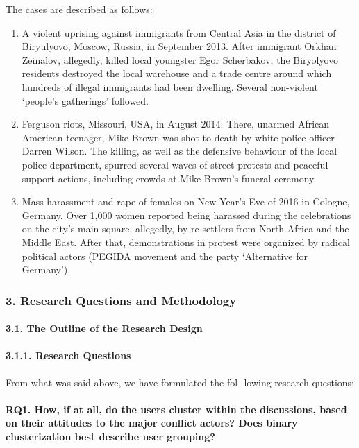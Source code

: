 The cases are described as follows:
\begin{enumerate}
	\item A violent uprising against immigrants from Central Asia in the district of Biryulyovo, Moscow, Russia, in September 2013. After immigrant Orkhan Zeinalov, allegedly, killed local youngster Egor Scherbakov, the Biryolyovo residents destroyed the local warehouse and a trade centre around which hundreds of illegal immigrants had been dwelling. Several non-violent ‘people’s gatherings’ followed.
	
	\item Ferguson riots, Missouri, USA, in August 2014. There, unarmed African American teenager, Mike Brown was shot to death by white police officer Darren Wilson. The killing, as well as the defensive behaviour of the local police department, spurred several waves of street protests and peaceful support actions, including crowds at Mike Brown’s funeral ceremony.
	
	\item Mass harassment and rape of females on New Year’s Eve of 2016 in Cologne, Germany. Over 1,000 women reported being harassed during the celebrations on the city’s main square, allegedly, by re-settlers from North Africa and the Middle East. After that, demonstrations in protest were organized by radical political actors (PEGIDA movement and the party ‘Alternative for Germany’).
\end{enumerate}

\subsubsection{3. Research Questions and Methodology}

\paragraph{3.1. The Outline of the Research Design}

\paragraph{3.1.1. Research Questions} From what was said above, we have formulated the fol- lowing research questions:

\paragraph{RQ1. How, if at all, do the users cluster within the discussions, based on their attitudes to the major conflict actors? Does binary clusterization best describe user grouping?}

